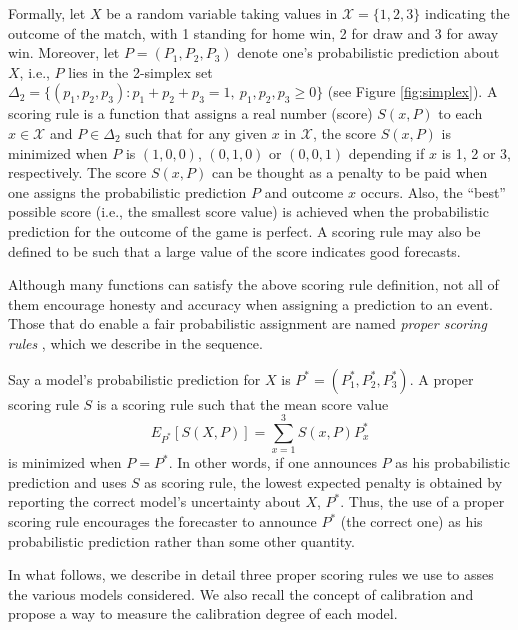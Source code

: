 \documentclass[journal,article,accept,moreauthors,pdftex,12pt,a4paper]{mdpi}
\begin{document}
	Formally, let $X$ be a random variable
	taking values in $\mathcal{X}=\{1,2,3\}$ indicating
	the outcome of the match, with 1 standing for home win, 2 for draw and 3 for away win.  Moreover, let $P=(P_1,P_2,P_3)$ denote one's probabilistic prediction
	about $X$, i.e., $P$ lies in the 2-simplex set $\Delta_2=\{(p_1,p_2,p_3):p_1+p_2+p_3=1, \ p_1,p_2,p_3\geq0\}$ (see Figure
	\ref{fig:simplex}).
	A scoring rule is a function
	that assigns a real number (score) $S(x,P)$ to each $x \in \mathcal{X}$
	and $P \in \Delta_2$
	such that
	for any given $x$ in $\mathcal{X}$, the score  $S(x,P)$ is minimized when $P$ is
	$(1,0,0)$, $(0,1,0)$ or $(0,0,1)$ depending if $x$ is 1, 2 or 3, respectively.
	The score $S(x,P)$ can be thought as
	a penalty to be paid when one assigns the
	probabilistic prediction $P$ and outcome
	$x$ occurs. Also, the ``best'' possible score (i.e., the smallest score value) is achieved when the probabilistic prediction for the outcome of the game is perfect. A scoring rule may also be defined to be such that a large value of the score indicates good forecasts.
	
	Although many functions can satisfy the above scoring rule definition, not all of them encourage honesty and accuracy when assigning a prediction to an event. Those that do enable a fair probabilistic assignment are named \emph{proper scoring rules} \cite{lad}, which we describe in the sequence.
	
	Say a model's probabilistic prediction for $X$ is $P^*=(P_1^*,P_2^*,P_3^*).$ A proper scoring rule $S$ is a scoring rule  such that the mean score value
	$$E_{P^*}[S(X,P)]=\sum_{x=1}^3 S(x,P)P^*_x$$
	is minimized when $P=P^*$.
	In other words, if one announces
	$P$ as his probabilistic prediction
	and uses $S$ as scoring rule, the lowest
	expected penalty is obtained by reporting the correct model's  uncertainty about $X$, $P^*$.
	Thus, the use of a proper scoring rule encourages the forecaster to announce $P^*$ (the correct one)
	as his probabilistic prediction  rather than some other quantity.
	
	In what follows, we describe in detail three proper scoring rules we use to asses the various models considered.
	We also recall the concept of calibration and propose a way to measure the calibration degree of each model.
	
\end{document}
